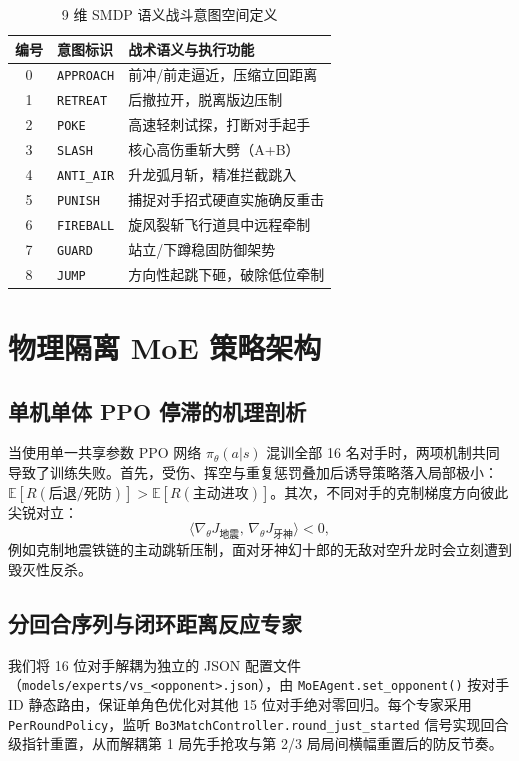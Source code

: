 \documentclass[10pt,twocolumn]{article}
\begin{document}
\begin{table}[t]
\centering
\caption{9 维 SMDP 语义战斗意图空间定义}
\label{tab:intents}
\small
\begin{tabular}{c l l}
\hline
\textbf{编号} & \textbf{意图标识} & \textbf{战术语义与执行功能} \\
\hline
0 & \texttt{APPROACH} & 前冲/前走逼近，压缩立回距离 \\
1 & \texttt{RETREAT}  & 后撤拉开，脱离版边压制 \\
2 & \texttt{POKE}     & 高速轻刺试探，打断对手起手 \\
3 & \texttt{SLASH}    & 核心高伤重斩大劈（A+B） \\
4 & \texttt{ANTI\_AIR} & 升龙弧月斩，精准拦截跳入 \\
5 & \texttt{PUNISH}   & 捕捉对手招式硬直实施确反重击 \\
6 & \texttt{FIREBALL} & 旋风裂斩飞行道具中远程牵制 \\
7 & \texttt{GUARD}    & 站立/下蹲稳固防御架势 \\
8 & \texttt{JUMP}     & 方向性起跳下砸，破除低位牵制 \\
\hline
\end{tabular}
\end{table}

\section{物理隔离 MoE 策略架构}
\subsection{单机单体 PPO 停滞的机理剖析}
当使用单一共享参数 PPO 网络 $\pi_\theta(a|s)$ 混训全部 16 名对手时，两项机制共同导致了训练失败。首先，受伤、挥空与重复惩罚叠加后诱导策略落入局部极小：$\mathbb{E}[R(\text{后退/死防})] > \mathbb{E}[R(\text{主动进攻})]$。其次，不同对手的克制梯度方向彼此尖锐对立：
\begin{equation}
\langle \nabla_\theta J_{\text{地震}},\, \nabla_\theta J_{\text{牙神}} \rangle < 0,
\end{equation}
例如克制地震铁链的主动跳斩压制，面对牙神幻十郎的无敌对空升龙时会立刻遭到毁灭性反杀。

\subsection{分回合序列与闭环距离反应专家}
我们将 16 位对手解耦为独立的 JSON 配置文件（\texttt{models/experts/vs\_<opponent>.json}），由 \texttt{MoEAgent.set\_opponent()} 按对手 ID 静态路由，保证单角色优化对其他 15 位对手绝对零回归。每个专家采用 \texttt{PerRoundPolicy}，监听 \texttt{Bo3MatchController.round\_just\_started} 信号实现回合级指针重置，从而解耦第 1 局先手抢攻与第 2/3 局局间横幅重置后的防反节奏。
\end{document}

